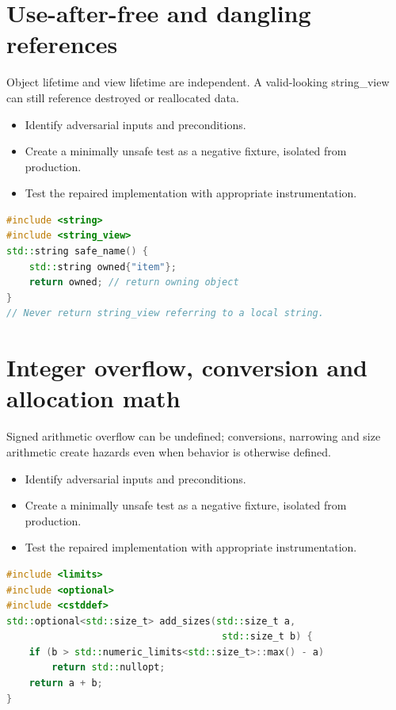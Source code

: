 \documentclass[11pt]{article}
\begin{document}
\section{Use-after-free and dangling references}
Object lifetime and view lifetime are independent. A valid-looking string\_view can still reference destroyed or reallocated data.

\begin{itemize}[leftmargin=*,itemsep=1pt,topsep=3pt]
\item Identify adversarial inputs and preconditions.
\item Create a minimally unsafe test as a negative fixture, isolated from production.
\item Test the repaired implementation with appropriate instrumentation.
\end{itemize}
\begin{lstlisting}[language=C++]
#include <string>
#include <string_view>
std::string safe_name() {
    std::string owned{"item"};
    return owned; // return owning object
}
// Never return string_view referring to a local string.
\end{lstlisting}
\section{Integer overflow, conversion and allocation math}
Signed arithmetic overflow can be undefined; conversions, narrowing and size arithmetic create hazards even when behavior is otherwise defined.

\begin{itemize}[leftmargin=*,itemsep=1pt,topsep=3pt]
\item Identify adversarial inputs and preconditions.
\item Create a minimally unsafe test as a negative fixture, isolated from production.
\item Test the repaired implementation with appropriate instrumentation.
\end{itemize}
\begin{lstlisting}[language=C++]
#include <limits>
#include <optional>
#include <cstddef>
std::optional<std::size_t> add_sizes(std::size_t a,
                                      std::size_t b) {
    if (b > std::numeric_limits<std::size_t>::max() - a)
        return std::nullopt;
    return a + b;
}
\end{lstlisting}
\end{document}
